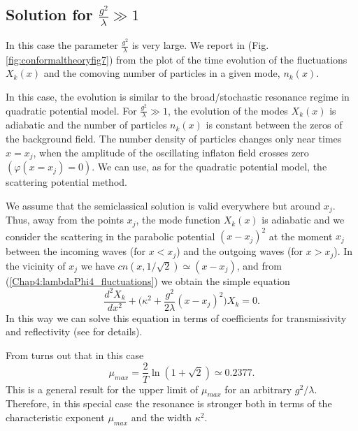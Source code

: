 \documentclass[11pt,a4paper,twoside]{book}
\begin{document}
\subsection*{Solution for  $ \frac{g^{2}}{\lambda} \gg 1 $ }
In this case the parameter $ \frac{g^{2}}{\lambda}$ is very large. We report in (Fig. \ref{fig:conformaltheoryfig7}) from \cite{Chap4:ModelLambdaPhi4Reference} the plot of the time evolution of the fluctuations $ X_{k}(x) $ and the comoving number of particles in a given mode, $ n_{k}(x) $.

In this case, the evolution is similar to the broad/stochastic resonance regime in quadratic potential model. For $ \frac{g^{2}}{\lambda} \gg 1 $, the evolution of the modes $ X_{k}(x) $ is adiabatic and the number of particles $ n_{k}(x) $ is constant between the zeros of the background field. The number density of particles changes only near times $ x=x_{j} $,  when the amplitude of the oscillating inflaton field crosses zero $ (\varphi(x=x_{j})=0) $. We can use, as for the quadratic potential model, the scattering potential method.

We assume that the semiclassical solution is valid everywhere but around $ x_{j} $. Thus, away from the points $ x_{j} $, the mode function $ X_{k}(x) $ is adiabatic and we consider the scattering in the parabolic potential $ (x-x_{j})^{2} $ at the moment $ x_{j} $ between the incoming waves (for $ x<x_{j} $) and the outgoing waves (for $ x > x_{j} $). In the vicinity of $ x_{j} $ we have $ cn(x,1/\sqrt{2})\simeq (x-x_{j}) $, and from (\ref{Chap4:lambdaPhi4_fluctuations}) we obtain the simple equation
\begin{equation}
\label{Chap4:lambdaPhi4_simpleEquationAroundXj}
\frac{d^{2}X_{k}}{dx^{2}} + \Bigg(\kappa^{2} + \frac{g^{2}}{2\lambda}(x-x_{j})^{2}\Bigg) X_{k}= 0.
\end{equation}
In this way we can solve this equation in terms of coefficients  for transmissivity and reflectivity (see \cite{Chap4:ModelLambdaPhi4Reference} for details).

From \cite{Chap4:ModelLambdaPhi4Reference } turns out that in this case
\begin{equation}
\label{Chap4:lambdaPhi4_umaxParabolicPotential}
\mu_{max} = \frac{2}{T}\ln(1+\sqrt{2}) \simeq 0.2377.
\end{equation}
This is a general result for the upper limit of $ \mu_{max} $ for an arbitrary $ g^{2}/\lambda $. Therefore, in this special case the resonance is stronger both in terms of the characteristic exponent $ \mu_{max} $ and the width $ \kappa^{2} $.
\end{document}
